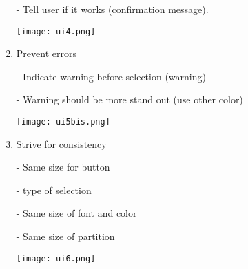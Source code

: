 \documentclass[12pt,a4paper]{article}
\begin{document}
\begin{enumerate}
	\par - Tell user if it works (confirmation message). 
	\par \texttt{[image: ui4.png]} 
\item Prevent errors
	\par - Indicate warning before selection (warning)
	\par - Warning should be more stand out (use other color)
	\par \texttt{[image: ui5bis.png]} 
\item Strive for consistency
	\par - Same size for button
	\par - type of selection
	\par - Same size of font and color
	\par - Same size of partition
	\par \texttt{[image: ui6.png]} 	
\end{enumerate}
\end{document}

